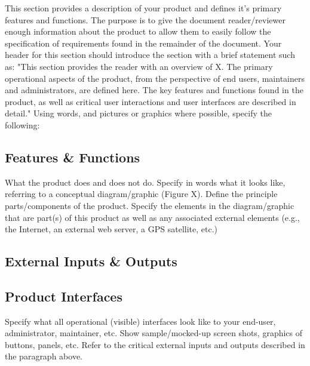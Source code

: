 This section provides a description of your product and defines it's primary features and functions. The purpose is to give the document reader/reviewer enough information about the product to allow them to easily follow the specification of requirements found in the remainder of the document. Your header for this section should introduce the section with a brief statement such as: "This section provides the reader with an overview of X. The primary operational aspects of the product, from the perspective of end users, maintainers and administrators, are defined here. The key features and functions found in the product, as well as critical user interactions and user interfaces are described in detail." Using words, and pictures or graphics where possible, specify the following:

\subsection{Features \& Functions}
What the product does and does not do. Specify in words what it looks like, referring to a conceptual diagram/graphic (Figure X).  Define the principle parts/components of the product. Specify the elements in the diagram/graphic that are part(s) of this product as well as any associated external elements (e.g., the Internet, an external web server, a GPS satellite, etc.)

\subsection{External Inputs \& Outputs}
\begin{table}[h]
\end{table}

\subsection{Product Interfaces}
Specify what all operational (visible) interfaces look like to your end-user, administrator, maintainer, etc. Show sample/mocked-up screen shots, graphics of buttons, panels, etc. Refer to the critical external inputs and outputs described in the paragraph above.
